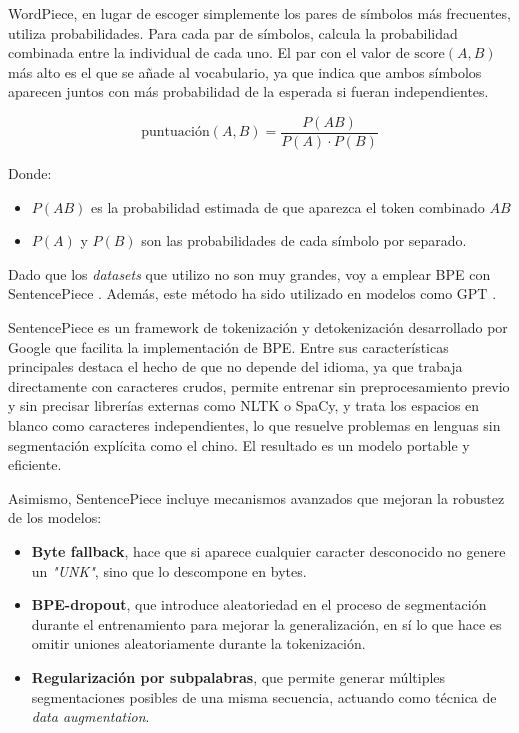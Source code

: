 \documentclass[11pt]{book}
\begin{document}
WordPiece, en lugar de escoger simplemente los pares de símbolos más frecuentes, utiliza probabilidades. Para cada par de símbolos, calcula la probabilidad combinada entre la individual de cada uno. El par con el valor de $\text{score}(A,B)$ más alto es el que se añade al vocabulario, ya que indica que ambos símbolos aparecen juntos con más probabilidad de la esperada si fueran independientes.

\[
\text{puntuación}(A,B) = \frac{P(AB)}{P(A) \cdot P(B)}
\]

Donde:
\begin{itemize}
    \item $P(AB)$ es la probabilidad estimada de que aparezca el token combinado $AB$
    \item $P(A)$ y $P(B)$ son las probabilidades de cada símbolo por separado.
\end{itemize}

Dado que los \textit{datasets} que utilizo no son muy grandes, voy a emplear BPE con SentencePiece \parencite{google_sentencepiece}. Además, este método ha sido utilizado en modelos como GPT \parencite{reddit2021tokenizers}. 

SentencePiece es un framework de tokenización y detokenización desarrollado por Google que facilita la implementación de BPE. Entre sus características principales destaca el hecho de que no depende del idioma, ya que trabaja directamente con caracteres crudos, permite entrenar sin preprocesamiento previo y sin precisar librerías externas como NLTK o SpaCy, y trata los espacios en blanco como caracteres independientes, lo que resuelve problemas en lenguas sin segmentación explícita como el chino. El resultado es un modelo portable y eficiente. 

Asimismo, SentencePiece incluye mecanismos avanzados que mejoran la robustez de los modelos: 
\begin{itemize}
    \item \textbf{Byte fallback}, hace que si aparece cualquier caracter desconocido no genere un \textit{"UNK"}, sino que lo descompone en bytes.
    \item \textbf{BPE-dropout}, que introduce aleatoriedad en el proceso de segmentación durante el entrenamiento para mejorar la generalización, en sí lo que hace es omitir uniones aleatoriamente durante la tokenización.
    \item \textbf{Regularización por subpalabras}, que permite generar múltiples segmentaciones posibles de una misma secuencia, actuando como técnica de \textit{data augmentation}.
\end{itemize}
\end{document}
